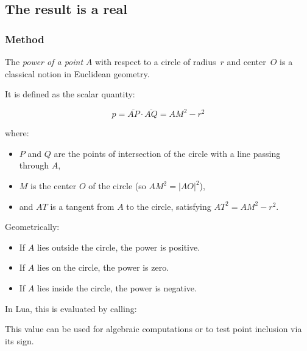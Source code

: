 \subsection{The result is a real}

\subsubsection{Method }
\label{ssub:method_circle_power_pt}

The \emph{power of a point} $A$ with respect to a circle of radius~$r$ and center~$O$ is a classical notion in Euclidean geometry.

\medskip
\noindent
It is defined as the scalar quantity:

\[
p = \overline{AP} \cdot \overline{AQ} = AM^2 - r^2
\]

where:
\begin{itemize}
  \item $P$ and $Q$ are the points of intersection of the circle with a line passing through $A$,
  \item $M$ is the center $O$ of the circle (so $AM^2 = |AO|^2$),
  \item and $AT$ is a tangent from $A$ to the circle, satisfying $AT^2 = AM^2 - r^2$.
\end{itemize}

\noindent
Geometrically:
\begin{itemize}
  \item If $A$ lies outside the circle, the power is positive.
  \item If $A$ lies on the circle, the power is zero.
  \item If $A$ lies inside the circle, the power is negative.
\end{itemize}

\medskip
\noindent
In Lua, this is evaluated by calling:

\begin{center}
\end{center}

\noindent
This value can be used for algebraic computations or to test point inclusion via its sign.

\vspace{1em}

